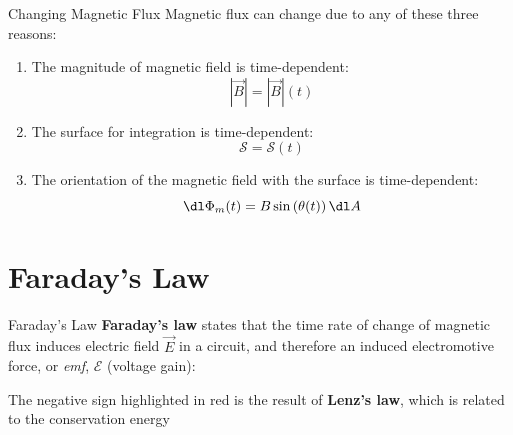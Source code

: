 \documentclass[12pt,aspectratio=169]{beamer}
\begin{document}
\begin{frame}{Changing Magnetic Flux}
  Magnetic flux can change due to any of these three reasons:
  \begin{enumerate}
  \item The magnitude of magnetic field is time-dependent:
    \begin{displaymath}
      |\vec B|=|\vec B|(t)
    \end{displaymath}
  \item The surface for integration is time-dependent:
    \begin{displaymath}
      \mathcal S=\mathcal S(t)
    \end{displaymath}
  \item The orientation of the magnetic field with the surface is
    time-dependent:
    \begin{displaymath}
      \dl\Phi_m(t)=%
      B\sin\left(\theta(t)\right)\dl A
    \end{displaymath}
  \end{enumerate}
\end{frame}



\section{Faraday's Law}

\begin{frame}{Faraday's Law}
  \textbf{Faraday's law} states that the time rate of change of magnetic flux
  induces electric field $\vec E$ in a circuit, and therefore an
  induced electromotive force, or \emph{emf}, $\mathcal E$ (voltage gain):

  
  The negative sign {\color{red}highlighted in red} is the result of
  \textbf{Lenz's law}, which is related to the conservation energy
\end{frame}
\end{document}

